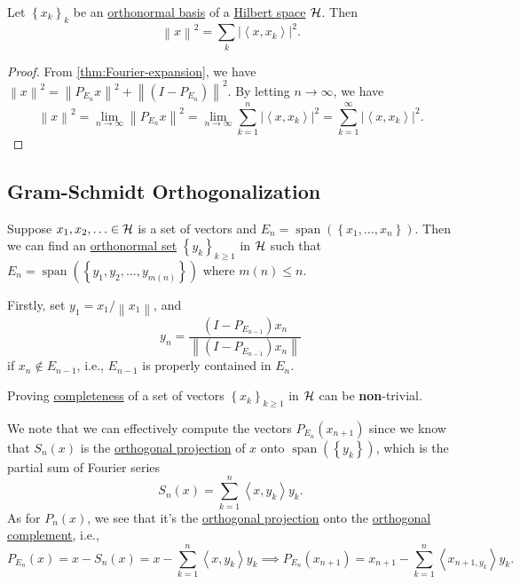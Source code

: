 \begin{corollary}
	Let \(\left\{ x_k \right\} _k\) be an \hyperref[def:orthonormal-basis]{orthonormal basis} of a \hyperref[def:Hilbert-space]{Hilbert space} \(\mathcal{\MakeUppercase{h}} \). Then
	\[
		\left\lVert x\right\rVert ^{2} = \sum_{k} \left\vert \left\langle x, x_k \right\rangle  \right\vert ^{2} .
	\]
\end{corollary}
\begin{proof}
	From \autoref{thm:Fourier-expansion}, we have \(\left\lVert x\right\rVert ^{2} = \left\lVert P_{E_n} x \right\rVert^{2} + \left\lVert (I - P_{E_{n} })\right\rVert ^{2}\). By letting \(n \to \infty \), we have
	\[
		\left\lVert x\right\rVert^{2} = \lim\limits_{n \to \infty} \left\lVert P_{E_n}x\right\rVert ^{2} = \lim\limits_{n \to \infty} \sum_{k=1}^{n} \left\vert \left\langle x, x_{k}  \right\rangle  \right\vert ^{2} = \sum_{k=1}^{\infty} \left\vert \left\langle x, x_{k}  \right\rangle  \right\vert  ^{2}.
	\]
\end{proof}

\subsection{Gram-Schmidt Orthogonalization}

Suppose \(x_1, x_2, \ldots \in \mathcal{\MakeUppercase{h}}\) is a set of vectors and \(E_n = \mathop{\mathrm{span}}(\left\{ x_1, \ldots , x_n \right\} )\). Then we can find an \hyperref[def:orthonormal-system]{orthonormal set} \(\left\{ y_{k} \right\}_{k\geq 1}\) in \(\mathcal{\MakeUppercase{h}}\) such that \(E_n = \mathop{\mathrm{span}}(\left\{ y_1, y_2, \ldots , y_{m(n)}  \right\} )\) where \(m(n) \leq n\).

Firstly, set \(y_1 = x_1 / \left\lVert x_1\right\rVert \), and
\[
	y_n = \frac{(I - P_{E_{n-1}})x_n}{\left\lVert (I - P_{E_{n-1}})x_n \right\rVert}
\]
if \(x_n \notin E_{n-1}\), i.e., \(E_{n-1}\) is properly contained in \(E_n\).

\begin{remark}
	Proving \hyperref[def:complete-system]{completeness} of a set of vectors \(\left\{ x_k \right\}_{k\geq 1} \) in \(\mathcal{\MakeUppercase{h}} \) can be \textbf{non}-trivial.
\end{remark}

We note that we can effectively compute the vectors \(P_{E_n} (x_{n+1}) \) since we know that \(S_n(x)\) is the \hyperref[def:orthogonal-projection]{orthogonal projection} of \(x\) onto \(\mathop{\mathrm{span}}(\left\{ y_k \right\} )\), which is the partial sum of Fourier series
\[
	S_n(x) = \sum_{k=1} ^n \left\langle x, y_k \right\rangle y_k.
\]
As for \(P_n(x)\), we see that it's the \hyperref[def:orthogonal-projection]{orthogonal projection} onto the \hyperref[def:orthogonal-complement]{orthogonal complement}, i.e.,
\[
	P_{E_n}(x) = x - S_n(x) = x - \sum_{k=1} ^n \left\langle x, y_{k}  \right\rangle y_{k} \implies P_{E_n}(x_{n+1} ) = x_{n+1} - \sum\limits_{k=1}^{n} \left\langle x_{n+1, y_{k} }  \right\rangle  y_{k}.
\]

